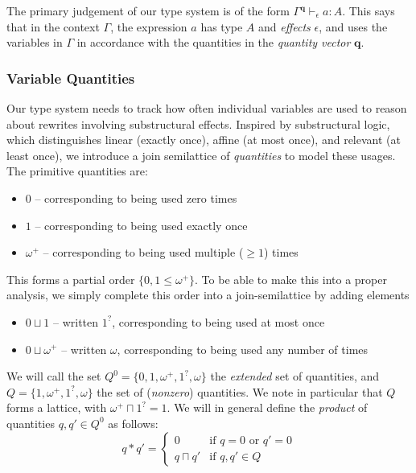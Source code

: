 \documentclass[acmsmall,screen,review]{acmart}
\newcommand{\mb}[1]{\ensuremath{\mathbf{#1}}}
\newcommand{\hasty}[4]{#1 \vdash_{#2} #3: {#4}}
\newcommand{\zeroq}{0}
\newcommand{\oneq}{1}
\newcommand{\delq}{1^?}
\newcommand{\cpyq}{\omega^+}
\newcommand{\topq}{\omega}
\begin{document}
The primary judgement of our type system is of the form $\hasty{\Gamma^{\mb{q}}}{\epsilon}{a}{A}$.
This says that in the context $\Gamma$, the expression $a$ has type $A$ and \emph{effects}
$\epsilon$, and uses the variables in $\Gamma$ in accordance with the quantities in the
\emph{quantity vector} $\mb{q}$.

\subsubsection{Variable Quantities}

Our type system needs to track how often individual variables are used to reason about rewrites
involving substructural effects. Inspired by substructural logic, which distinguishes linear
(exactly once), affine (at most once), and relevant (at least once), we introduce a join semilattice
of \emph{quantities} to model these usages. The primitive quantities are:
\begin{itemize}
  \item $\zeroq$ -- corresponding to being used zero times
  \item $\oneq$ -- corresponding to being used exactly once
  \item $\cpyq$ -- corresponding to being used multiple ($\geq 1$) times
\end{itemize}
This forms a partial order $\{\zeroq, \oneq \leq \cpyq\}$. To be able to make this into a proper
analysis, we simply complete this order into a join-semilattice by adding elements
\begin{itemize}
  \item $\zeroq \sqcup \oneq$ -- written $\delq$, corresponding to being used at most once
  \item $\zeroq \sqcup \cpyq$ -- written $\topq$, corresponding to being used any number of times
\end{itemize}
We will call the set $Q^0 = \{\zeroq, \oneq, \cpyq, \delq, \topq\}$ the \emph{extended} set of
quantities, and $Q = \{\oneq, \cpyq, \delq, \topq\}$ the set of (\emph{nonzero}) quantities. We note
in particular that $Q$ forms a lattice, with $\cpyq \sqcap \delq = \oneq$. We will in general define
the \emph{product} of quantities $q, q' \in Q^0$ as follows:
\begin{equation}
  q * q' = \begin{cases}
    0 & \text{if } q = 0 \text{ or } q' = 0 \\
    q \sqcap q' & \text{if } q, q' \in Q
  \end{cases}
\end{equation}
\end{document}
